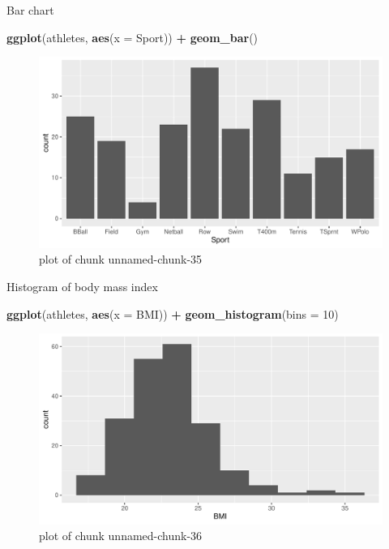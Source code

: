 \documentclass[ignorenonframetext,]{beamer}
\newenvironment{Shaded}{\begin{snugshade}}{\end{snugshade}}
\newcommand{\DataTypeTok}[1]{\textcolor[rgb]{0.13,0.29,0.53}{#1}}
\newcommand{\DecValTok}[1]{\textcolor[rgb]{0.00,0.00,0.81}{#1}}
\newcommand{\KeywordTok}[1]{\textcolor[rgb]{0.13,0.29,0.53}{\textbf{#1}}}
\newcommand{\NormalTok}[1]{#1}
\newcommand{\OperatorTok}[1]{\textcolor[rgb]{0.81,0.36,0.00}{\textbf{#1}}}
\newcommand{\StringTok}[1]{\textcolor[rgb]{0.31,0.60,0.02}{#1}}
\begin{document}
\begin{frame}[fragile]{Bar chart}
\protect\hypertarget{bar-chart}{}

\begin{Shaded}
\begin{Highlighting}[]
\KeywordTok{ggplot}\NormalTok{(athletes, }\KeywordTok{aes}\NormalTok{(}\DataTypeTok{x =}\NormalTok{ Sport)) }\OperatorTok{+}\StringTok{ }\KeywordTok{geom_bar}\NormalTok{()}
\end{Highlighting}
\end{Shaded}

\begin{figure}
\centering
\includegraphics{figure/unnamed-chunk-35-1.pdf}
\caption{plot of chunk unnamed-chunk-35}
\end{figure}

\end{frame}

\begin{frame}[fragile]{Histogram of body mass index}
\protect\hypertarget{histogram-of-body-mass-index}{}

\begin{Shaded}
\begin{Highlighting}[]
\KeywordTok{ggplot}\NormalTok{(athletes, }\KeywordTok{aes}\NormalTok{(}\DataTypeTok{x =}\NormalTok{ BMI)) }\OperatorTok{+}\StringTok{ }\KeywordTok{geom_histogram}\NormalTok{(}\DataTypeTok{bins =} \DecValTok{10}\NormalTok{)}
\end{Highlighting}
\end{Shaded}

\begin{figure}
\centering
\includegraphics{figure/unnamed-chunk-36-1.pdf}
\caption{plot of chunk unnamed-chunk-36}
\end{figure}

\end{frame}
\end{document}
